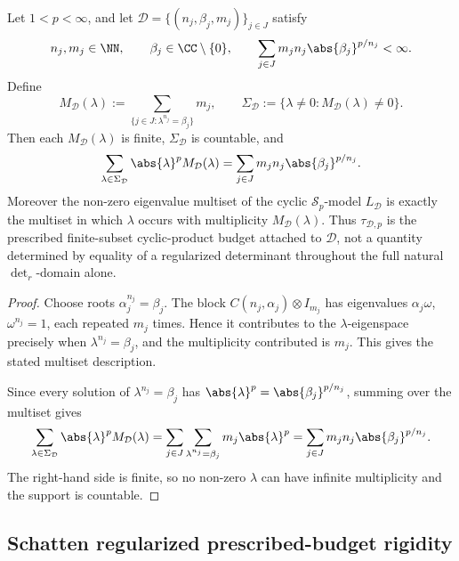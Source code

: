 \begin{lemma}
  \label{lem:schatten-collapsed-multiplicities}
  Let \(1<p<\infty\), and let
  \(\mathcal D=\{(n_j,\beta_j,m_j)\}_{j\in J}\) satisfy
  \[
    n_j,m_j\in\NN,\qquad
    \beta_j\in\CC\setminus\{0\},\qquad
    \sum_{j\in J}m_jn_j\abs{\beta_j}^{p/n_j}<\infty .
  \]
  Define
  \[
    M_{\mathcal D}(\lambda)
    :=\sum_{\{j\in J:\lambda^{n_j}=\beta_j\}}m_j,
    \qquad
    \Sigma_{\mathcal D}
    :=\{\lambda\neq0:M_{\mathcal D}(\lambda)\neq0\}.
  \]
  Then each \(M_{\mathcal D}(\lambda)\) is finite,
  \(\Sigma_{\mathcal D}\) is countable, and
  \[
    \sum_{\lambda\in\Sigma_{\mathcal D}}
      \abs{\lambda}^pM_{\mathcal D}(\lambda)
    =\sum_{j\in J}m_jn_j\abs{\beta_j}^{p/n_j}.
  \]
  Moreover the non-zero eigenvalue multiset of the cyclic
  \(\mathcal S_p\)-model \(L_{\mathcal D}\) is exactly the multiset in
  which \(\lambda\) occurs with multiplicity \(M_{\mathcal D}(\lambda)\).
  Thus \(\tau_{\mathcal D,p}\) is the prescribed finite-subset cyclic-product budget
  attached to \(\mathcal D\), not a quantity determined by equality of a
  regularized determinant throughout the full natural \(\det_r\)-domain alone.
\end{lemma}

\begin{proof}
  Choose roots \(\alpha_j^{n_j}=\beta_j\). The block
  \(C(n_j,\alpha_j)\otimes I_{m_j}\) has eigenvalues
  \(\alpha_j\omega\), \(\omega^{n_j}=1\), each repeated \(m_j\) times.
  Hence it contributes to the \(\lambda\)-eigenspace precisely when
  \(\lambda^{n_j}=\beta_j\), and the multiplicity contributed is \(m_j\).
  This gives the stated multiset description.

  Since every solution of \(\lambda^{n_j}=\beta_j\) has
  \(\abs{\lambda}^p=\abs{\beta_j}^{p/n_j}\), summing over the multiset
  gives
  \[
    \sum_{\lambda\in\Sigma_{\mathcal D}}
      \abs{\lambda}^pM_{\mathcal D}(\lambda)
    =
    \sum_{j\in J}\sum_{\lambda^{n_j}=\beta_j}
      m_j\abs{\lambda}^p
    =
    \sum_{j\in J}m_jn_j\abs{\beta_j}^{p/n_j}.
  \]
  The right-hand side is finite, so no non-zero \(\lambda\) can have
  infinite multiplicity and the support is countable.
\end{proof}

\subsection{Schatten regularized prescribed-budget rigidity}\label{sec:schatten-prescribed-budget-rigidity}

